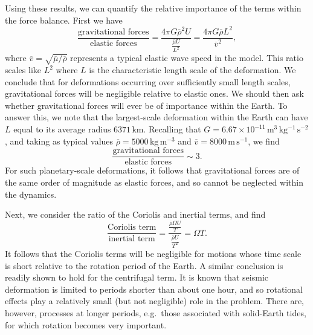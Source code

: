 Using these results, we can quantify the relative importance of the terms within the force balance. First we have
\begin{equation}
\frac{\text{gravitational forces}}{\text{elastic forces}}=\frac{4\pi G\overline{\rho}^{2}U}
{\frac{\overline{\mu} U}{L^{2}}}=\frac{4\pi G\overline{\rho}L^{2}}{\overline{v}^{2}},
\label{eq:54}
\end{equation}
where $\overline{v}=\sqrt{\overline{\mu}/\overline{\rho}}$ represents a typical elastic wave speed in the model. 
This ratio scales like $L^{2}$ where $L$ is the characteristic length scale of the deformation. We conclude that 
for deformations occurring over sufficiently small length scales, gravitational forces will be negligible relative 
to elastic ones. We should then ask whether gravitational forces will ever be of importance within the Earth. To 
answer this, we note that the largest-scale deformation within the Earth can have $L$ equal to its average radius $6371\,\mathrm{km}$.
Recalling that $G=6.67\times10^{-11}\,\mathrm{m^{3}\,kg^{-1}\,s^{-2}}$, and taking as typical values $\overline{\rho}=5000\,
\mathrm{kg\,m^{-3}}$ and $\overline{v}=8000\,\mathrm{m\,s^{-1}}$, we find
\begin{equation}
\frac{\text{gravitational forces}}{\text{elastic forces}}\sim3.
\label{eq:55}
\end{equation}
For such planetary-scale deformations, it follows that gravitational forces are of the same order of magnitude as elastic forces, 
and so cannot be neglected within the dynamics. 

Next, we consider the ratio of the Coriolis and inertial terms, and find
\begin{equation}
\frac{\text{Coriolis term}}{\text{inertial term}}=\frac{\frac{\overline{\rho}\Omega U}{T}}{\frac{\overline{\rho}U}{T^{2}}}=\Omega T.
\label{eq:56}
\end{equation}
It follows that the Coriolis terms will be negligible for motions whose time scale is short relative to the rotation period 
of the Earth. A similar conclusion is readily shown to hold for the centrifugal term. It is known that seismic deformation 
is limited to periods shorter than about one hour, and so rotational effects play a relatively small (but not negligible) 
role in the problem. There are, however, processes at longer periods, e.g.\ those associated with solid-Earth tides, for which 
rotation becomes very important.

